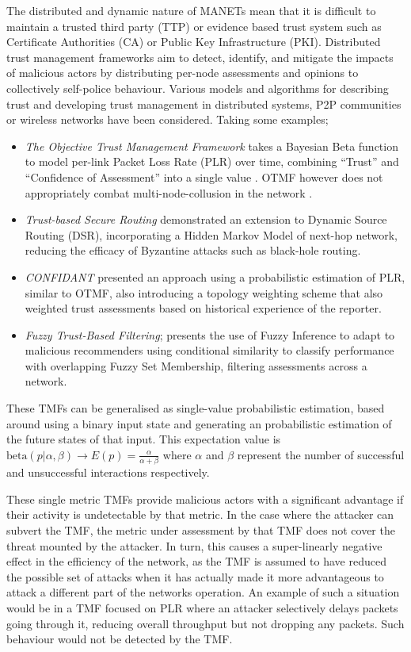 The distributed and dynamic nature of MANETs mean that it is difficult to maintain a trusted third party (TTP) or evidence based trust system such as Certificate Authorities (CA) or Public Key Infrastructure (PKI).
Distributed trust management frameworks aim to detect, identify, and mitigate the impacts of malicious actors by distributing per-node assessments and opinions to collectively self-police behaviour.
Various models and algorithms for describing trust and developing trust management in distributed systems, P2P communities or wireless networks have been considered.
Taking some examples;

\begin{itemize}
  \item \emph{The Objective Trust Management Framework} takes a Bayesian Beta function to model per-link Packet Loss Rate (PLR) over time, combining ``Trust'' and ``Confidence of Assessment'' into a single value \cite{Li2008}.
    OTMF however does not appropriately combat multi-node-collusion in the network \cite{Cho2011}.
  \item \emph{Trust-based Secure Routing}\cite{Moe2008a} demonstrated an extension to Dynamic Source Routing (DSR), incorporating a Hidden Markov Model of next-hop network, reducing the efficacy of Byzantine attacks such as black-hole routing.
  \item \emph{CONFIDANT}\cite{Buchegger2002} presented an approach using a probabilistic estimation of PLR, similar to OTMF, also introducing a topology weighting scheme that also weighted trust assessments based on historical experience of the reporter.
  \item \emph{Fuzzy Trust-Based Filtering}; \cite{Luo2008} presents the use of Fuzzy Inference to adapt to malicious recommenders using conditional similarity to classify performance with overlapping Fuzzy Set Membership, filtering assessments across a network.
\end{itemize}

These TMFs can be generalised as single-value probabilistic estimation, based around using a binary input state and generating an probabilistic estimation of the future states of that input. This expectation value is $\text{beta}(p|\alpha,\beta) \to E(p) = \frac{\alpha}{\alpha+\beta}$ where $\alpha$ and $\beta$ represent the number of successful and unsuccessful interactions respectively.

These single metric TMFs provide malicious actors with a significant advantage if their activity is undetectable by that metric.
In the case where the attacker can subvert the TMF, the metric under assessment by that TMF does not cover the threat mounted by the attacker.
In turn, this causes a super-linearly negative effect in the efficiency of the network, as the TMF is assumed to have reduced the possible set of attacks when it has actually made it more advantageous to attack a different part of the networks operation.
An example of such a situation would be in a TMF focused on PLR where an attacker selectively delays packets going through it, reducing overall throughput but not dropping any packets.
Such behaviour would not be detected by the TMF.

